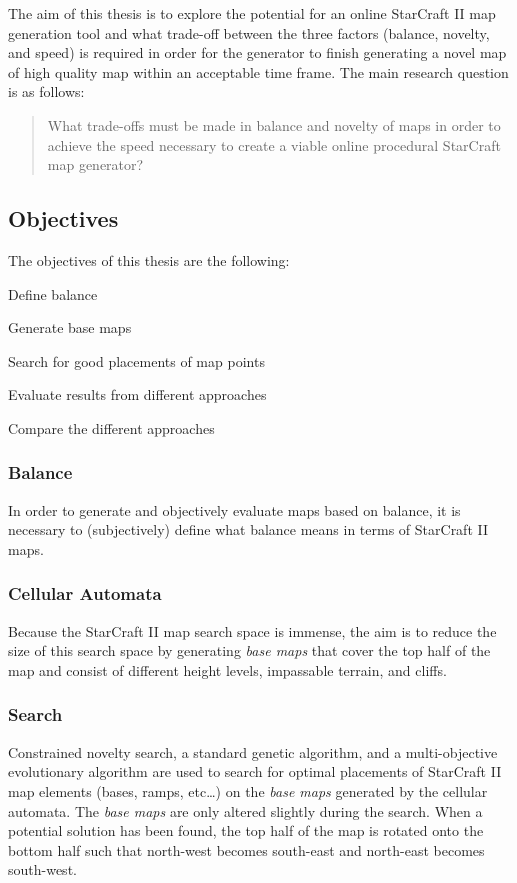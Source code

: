 The aim of this thesis is to explore the potential for an online StarCraft II map generation tool and what trade-off between the three factors (balance, novelty, and speed) is required in order for the generator to finish generating a novel map of high quality map within an acceptable time frame. The main research question is as follows:
\begin{quote}
What trade-offs must be made in balance and novelty of maps in order to achieve the speed necessary to create a viable online procedural StarCraft map generator?
\end{quote}

\subsection{Objectives}
\label{introduction_starcraft_objectives}
The objectives of this thesis are the following:
\begin{my_enumerate}
\item Define balance
\item Generate base maps
\item Search for good placements of map points
\item Evaluate results from different approaches
\item Compare the different approaches
\end{my_enumerate}

\subsubsection{Balance}
In order to generate and objectively evaluate maps based on balance, it is necessary to (subjectively) define what balance means in terms of StarCraft II maps.
\subsubsection{Cellular Automata}
Because the StarCraft II map search space is immense, the aim is to reduce the size of this search space by generating \textit{base maps} that cover the top half of the map and consist of different height levels, impassable terrain, and cliffs. 
\subsubsection{Search}
Constrained novelty search, a standard genetic algorithm, and a multi-objective evolutionary algorithm are used to search for optimal placements of StarCraft II map elements (bases, ramps, etc\ldots) on the \textit{base maps} generated by the cellular automata. The \textit{base maps} are only altered slightly during the search. When a potential solution has been found, the top half of the map is rotated onto the bottom half such that north-west becomes south-east and north-east becomes south-west.
